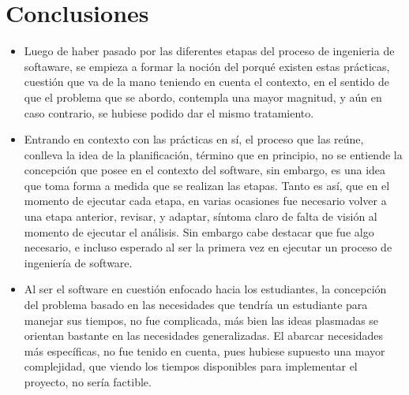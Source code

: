 \chapter{Conclusiones}

\begin{itemize}
\item Luego de haber pasado por las diferentes etapas del proceso de ingenieria de softaware, se empieza a formar la noción del porqué existen estas prácticas, cuestión que va de la mano teniendo en cuenta el contexto, en el sentido de que el problema que se abordo, contempla una mayor magnitud, y aún en caso contrario, se hubiese podido dar el mismo tratamiento.

\item Entrando en contexto con las prácticas en sí, el proceso que las reúne, conlleva la idea de la planificación, término que en principio, no se entiende la concepción que posee en el contexto del software, sin embargo, es una idea que toma forma a medida que se realizan las etapas. Tanto es así, que en el momento de ejecutar cada etapa, en varias ocasiones fue necesario volver a una etapa anterior, revisar, y adaptar, síntoma claro de falta de visión al momento de ejecutar el análisis. Sin embargo cabe destacar que fue algo necesario, e incluso esperado al ser la primera vez en ejecutar un proceso de ingeniería de software.

\item Al ser el software en cuestión enfocado hacia los estudiantes, la concepción del problema basado en las necesidades que tendría un estudiante para manejar sus tiempos, no fue complicada, más bien las ideas plasmadas se orientan bastante en las necesidades generalizadas. El abarcar necesidades más específicas, no fue tenido en cuenta, pues hubiese supuesto una mayor complejidad, que viendo los tiempos disponibles para implementar el proyecto, no sería factible. 
\end{itemize}


\newpage
